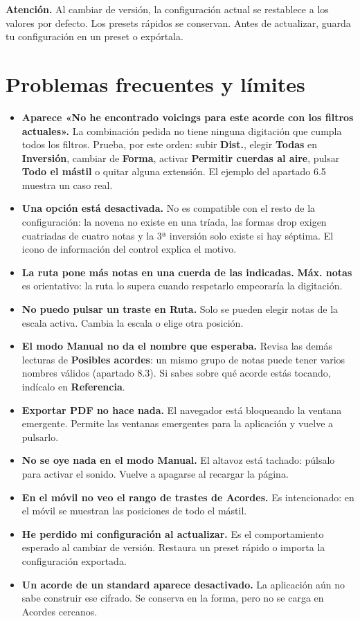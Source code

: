 \documentclass[a4paper,11pt,oneside]{report}
\renewenvironment{quote}{%
  \def\FrameCommand{{\color{amber}\vrule width 3pt}\fboxsep=7pt\colorbox{amber!9}}%
  \MakeFramed{\advance\hsize-\width\FrameRestore}\small\noindent\ignorespaces}%
  {\endMakeFramed}
\begin{document}
\begin{quote}
\textbf{Atención.} Al cambiar de versión, la configuración actual se restablece a los valores por defecto. Los presets rápidos se conservan. Antes de actualizar, guarda tu configuración en un preset o expórtala.
\end{quote}

\chapter{Problemas frecuentes y límites}\label{problemas-frecuentes-y-luxedmites}

\begin{itemize}
\item
  \textbf{Aparece «No he encontrado voicings para este acorde con los filtros actuales».} La combinación pedida no tiene ninguna digitación que cumpla todos los filtros. Prueba, por este orden: subir \textbf{Dist.}, elegir \textbf{Todas} en \textbf{Inversión}, cambiar de \textbf{Forma}, activar \textbf{Permitir cuerdas al aire}, pulsar \textbf{Todo el mástil} o quitar alguna extensión. El ejemplo del apartado 6.5 muestra un caso real.
\item
  \textbf{Una opción está desactivada.} No es compatible con el resto de la configuración: la novena no existe en una tríada, las formas drop exigen cuatriadas de cuatro notas y la 3ª inversión solo existe si hay séptima. El icono de información del control explica el motivo.
\item
  \textbf{La ruta pone más notas en una cuerda de las indicadas.} \textbf{Máx. notas} es orientativo: la ruta lo supera cuando respetarlo empeoraría la digitación.
\item
  \textbf{No puedo pulsar un traste en Ruta.} Solo se pueden elegir notas de la escala activa. Cambia la escala o elige otra posición.
\item
  \textbf{El modo Manual no da el nombre que esperaba.} Revisa las demás lecturas de \textbf{Posibles acordes}: un mismo grupo de notas puede tener varios nombres válidos (apartado 8.3). Si sabes sobre qué acorde estás tocando, indícalo en \textbf{Referencia}.
\item
  \textbf{Exportar PDF no hace nada.} El navegador está bloqueando la ventana emergente. Permite las ventanas emergentes para la aplicación y vuelve a pulsarlo.
\item
  \textbf{No se oye nada en el modo Manual.} El altavoz está tachado: púlsalo para activar el sonido. Vuelve a apagarse al recargar la página.
\item
  \textbf{En el móvil no veo el rango de trastes de Acordes.} Es intencionado: en el móvil se muestran las posiciones de todo el mástil.
\item
  \textbf{He perdido mi configuración al actualizar.} Es el comportamiento esperado al cambiar de versión. Restaura un preset rápido o importa la configuración exportada.
\item
  \textbf{Un acorde de un standard aparece desactivado.} La aplicación aún no sabe construir ese cifrado. Se conserva en la forma, pero no se carga en Acordes cercanos.
\end{itemize}
\end{document}

